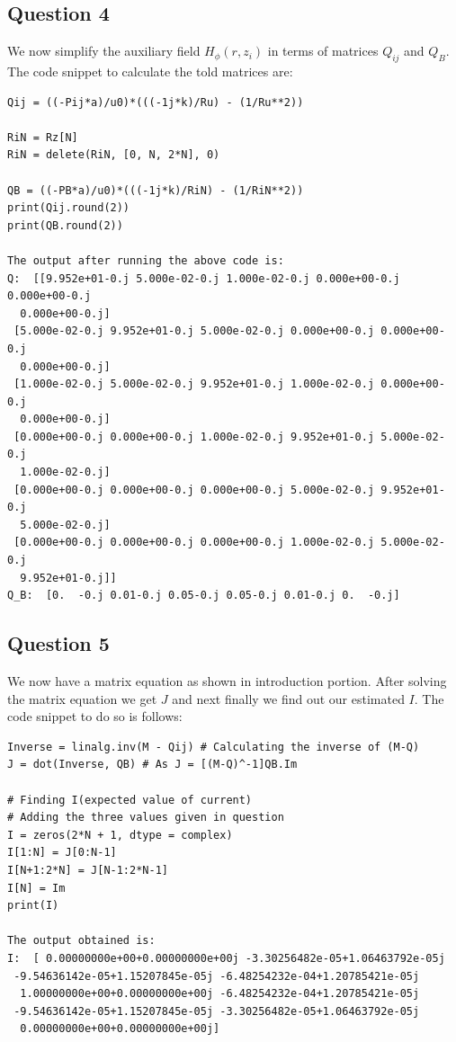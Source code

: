 \documentclass{article}
\begin{document}
\subsection{Question 4}
We now simplify the auxiliary field $H_{\phi}(r, z_{i})$ in terms of matrices $Q_{ij}$ and $Q_{B}$. The code snippet to calculate the told matrices are: 
\begin{verbatim}
Qij = ((-Pij*a)/u0)*(((-1j*k)/Ru) - (1/Ru**2))

RiN = Rz[N] 
RiN = delete(RiN, [0, N, 2*N], 0)  

QB = ((-PB*a)/u0)*(((-1j*k)/RiN) - (1/RiN**2))
print(Qij.round(2))
print(QB.round(2))

The output after running the above code is: 
Q:  [[9.952e+01-0.j 5.000e-02-0.j 1.000e-02-0.j 0.000e+00-0.j 0.000e+00-0.j
  0.000e+00-0.j]
 [5.000e-02-0.j 9.952e+01-0.j 5.000e-02-0.j 0.000e+00-0.j 0.000e+00-0.j
  0.000e+00-0.j]
 [1.000e-02-0.j 5.000e-02-0.j 9.952e+01-0.j 1.000e-02-0.j 0.000e+00-0.j
  0.000e+00-0.j]
 [0.000e+00-0.j 0.000e+00-0.j 1.000e-02-0.j 9.952e+01-0.j 5.000e-02-0.j
  1.000e-02-0.j]
 [0.000e+00-0.j 0.000e+00-0.j 0.000e+00-0.j 5.000e-02-0.j 9.952e+01-0.j
  5.000e-02-0.j]
 [0.000e+00-0.j 0.000e+00-0.j 0.000e+00-0.j 1.000e-02-0.j 5.000e-02-0.j
  9.952e+01-0.j]]
Q_B:  [0.  -0.j 0.01-0.j 0.05-0.j 0.05-0.j 0.01-0.j 0.  -0.j]
\end{verbatim}



\subsection{Question 5}
We now have a matrix equation as shown in introduction portion. After solving the matrix equation we get $J$ and next finally we find out our estimated $I$.
The code snippet to do so is follows:
\begin{verbatim}
Inverse = linalg.inv(M - Qij) # Calculating the inverse of (M-Q)
J = dot(Inverse, QB) # As J = [(M-Q)^-1]QB.Im

# Finding I(expected value of current)
# Adding the three values given in question
I = zeros(2*N + 1, dtype = complex)
I[1:N] = J[0:N-1]
I[N+1:2*N] = J[N-1:2*N-1]
I[N] = Im
print(I)

The output obtained is: 
I:  [ 0.00000000e+00+0.00000000e+00j -3.30256482e-05+1.06463792e-05j
 -9.54636142e-05+1.15207845e-05j -6.48254232e-04+1.20785421e-05j
  1.00000000e+00+0.00000000e+00j -6.48254232e-04+1.20785421e-05j
 -9.54636142e-05+1.15207845e-05j -3.30256482e-05+1.06463792e-05j
  0.00000000e+00+0.00000000e+00j]
\end{verbatim}
\end{document}
